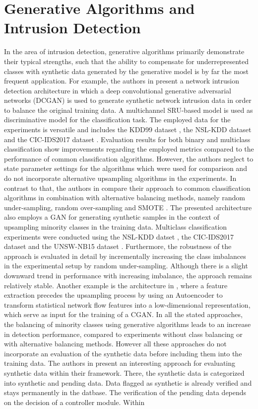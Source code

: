 \documentclass[../../main.tex]{subfiles}
\begin{document}
\section{Generative Algorithms and Intrusion Detection}

In the area of intrusion detection, generative algorithms primarily demonstrate their typical strengths, such that the ability to compensate for underrepresented classes with synthetic data generated by the generative model is by far the most frequent application. For example, the authors in \cite{8736331} present a network intrusion detection architecture in which a deep convolutional generative adversarial networks (DCGAN) is used to generate synthetic network intrusion data in order to balance the original training data. A multichannel SRU-based model is used as discriminative model for the classification task. The employed data for the experiments is versatile and includes the KDD99 dataset \cite{kdd99}, the NSL-KDD dataset \cite{nslkdd} and the CIC-IDS2017 dataset \cite{sharafaldin_toward_2018}. Evaluation results for both binary and multiclass classification show improvements regarding the employed metrics compared to the performance of common classification algorithms. However, the authors neglect to state parameter settings for the algorithms which were used for comparison and do not incorporate alternative upsampling algorithms in the experiments. In contrast to that, the authors in \cite{huang2020igan} compare their approach to common classification algorithms in combination with alternative balancing methods, namely random under-sampling, random over-sampling and SMOTE \cite{smote}. The presented architecture also employs a GAN for generating synthetic samples in the context of upsampling minority classes in the training data. Multiclass classification experiments were conducted using the NSL-KDD datset \cite{nslkdd}, the CIC-IDS2017 dataset \cite{sharafaldin_toward_2018} and the UNSW-NB15 dataset \cite{unswnb15}. Furthermore, the robustness of the approach is evaluated in detail by incrementally increasing the class imbalances in the experimental setup by random under-sampling. Although there is a slight downward trend in performance with increasing imbalance, the approach remains relatively stable. Another example is the architecture in \cite{lee2019ae}, where a feature extraction precedes the upsampling process by using an Autoencoder to transform statistical network flow features into a low-dimensional representation, which serve as input for the training of a CGAN. In all the stated approaches, the balancing of minority classes using generative algorithms leads to an increase in detection performance, compared to experiments without class balancing or with alternative balancing methods. However all these approaches do not incorporate an evaluation of the synthetic data before including them into the training data. The authors in \cite{shahriar2020g} present an interesting approach for evaluating synthetic data within their framework. There, the synthetic data is categorized into synthetic and pending data. Data flagged as synthetic is already verified and stays permanently in the datbase. The verification of the pending data depends on the decision of a controller module. Within 
\end{document}

